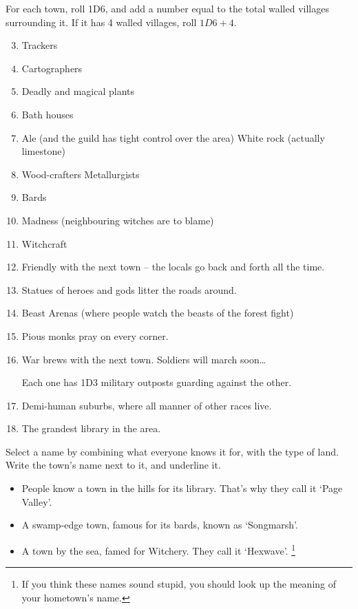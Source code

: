 \begin{multicols}{2}
For each town, roll 1D6, and add a number equal to the total walled villages surrounding it.
If it has 4 walled villages, roll $1D6+4$.

\begin{multicols}{2}

\begin{enumerate}
\setcounter{enumi}{2}
\item
  Trackers
\item
  Cartographers
\item
  Deadly and magical plants
\item
  Bath houses
\item
  \ifodd\value{r4}
    Ale (and the guild has tight control over the area)
  \else
    White rock (actually limestone)
  \fi
\item
  \ifodd\value{r4}
    Wood-crafters
  \else
    Metallurgists
  \fi
\item
 Bards
\item
  Madness (neighbouring witches are to blame)
\item
  Witchcraft
\item
  Friendly with the next town -- the locals go back and forth all the
  time.
\item
  Statues of heroes and gods litter the roads around.
\item
  Beast Arenas (where people watch the beasts of the forest fight)
\item
  Pious monks pray on every corner.
\item
  War brews with the next town.
  Soldiers will march soon\ldots

  Each one has 1D3 military outposts guarding against the other.
\item
  Demi-human suburbs, where all manner of other races live.
\item
  The grandest library in the area.
\end{enumerate}

\end{multicols}


Select a name by combining what everyone knows it for, with the type of
land.
Write the town's name next to it, and underline it.

\begin{itemize}
\item
  People know a town in the hills for its library. That's why they call
  it `Page Valley'.
\item
  A swamp-edge town, famous for its bards, known as `Songmarsh'.
\item
  A town by the sea, famed for Witchery.
  They call it `Hexwave'.%
  \footnote{If you think these names sound stupid, you should look up the meaning of your hometown's name.}
\end{itemize}


\end{multicols}

